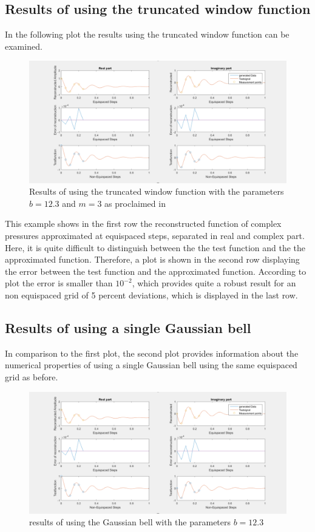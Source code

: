 \documentclass[11pt]{report} %
\begin{document}
\subsection{Results of using the truncated window function}
In the following plot the results using the truncated window function can be examined. 

\begin{figure}[H]
\centering
\includegraphics[scale=0.8]{./Figures/plot_trunc}
\caption{Results of using the truncated window function with the parameters $b=12.3$ and $m=3$ as proclaimed in }
\end{figure}

This example shows in the first row the reconstructed function of complex pressures approximated at equispaced steps, separated in real and complex part. 
Here, it is quite difficult to distinguish between the the test function and the the approximated function. 
Therefore, a plot is shown in the second row displaying the error between the test function and the approximated function. 
According to plot the error is smaller than $10^{-2}$, which provides quite a robust result for an non equispaced grid of 5 percent deviations, which is displayed in the last row.


\subsection{Results of using a single Gaussian bell}
In comparison to the first plot, the second plot provides information about the numerical properties of using a single Gaussian bell using the same equispaced grid as before.

\begin{figure}[H]
\centering
\includegraphics[scale=0.8]{./Figures/plot_trunc}
\caption{results of using the Gaussian bell with the parameters $b=12.3$}
\end{figure}
\end{document}
